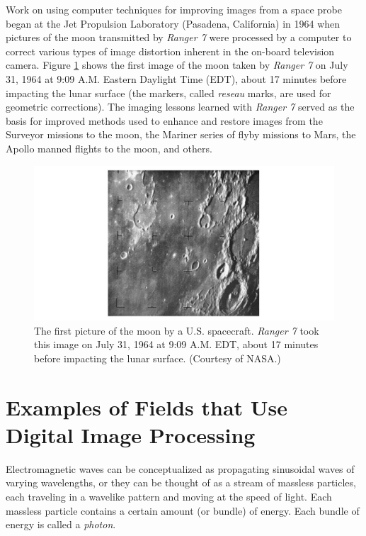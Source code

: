 \documentclass[12pt,a4paper,twoside,openany]{book}
\begin{document}
Work on using computer techniques for improving images from a space probe began at the Jet Propulsion Laboratory (Pasadena, California) in 1964 when pictures of the moon transmitted by \textit{Ranger 7} were processed by a computer to correct various types of image distortion inherent in the on-board television camera. Figure \ref{Figure:1.4} shows the first image of the moon taken by \textit{Ranger 7} on July 31, 1964 at 9:09 {\footnotesize A.M.} Eastern Daylight Time (EDT), about 17 minutes before impacting the lunar surface (the markers, called \textit{reseau} marks, are used for geometric corrections). The imaging lessons learned with \textit{Ranger 7} served as the basis for improved methods used to enhance and restore images from the Surveyor missions to the moon, the Mariner series of flyby missions to Mars, the Apollo manned flights to the moon, and others.

\begin{figure}[htbp]
    \centering
    \includegraphics[width=\linewidth]{Figure1 4.png}
    \caption{The first picture of the moon by a U.S. spacecraft. \textit{Ranger 7} took this image on July 31, 1964 at 9:09 {\footnotesize A.M.} EDT, about 17 minutes before impacting the lunar surface. (Courtesy of NASA.)}
    \label{Figure:1.4}
\end{figure}

\section{Examples of Fields that Use Digital Image Processing}

Electromagnetic waves can be conceptualized as propagating sinusoidal waves of varying wavelengths, or they can be thought of as a stream of massless particles, each traveling in a wavelike pattern and moving at the speed of light. Each massless particle contains a certain amount (or bundle) of energy. Each bundle of energy is called a \textit{photon}.
\end{document}

